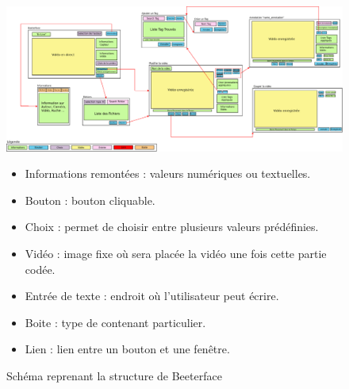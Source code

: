 \documentclass[11pt,french,a4paper]{report}
\begin{document}
\begin{landscape}
\begin{figure}[!h]
\begin{center}
\includegraphics[scale=0.2]{../images/dia/schema_interface.png}
    \setlength{\columnseprule}{0,3}
\begin{multicols}{2}
    \begin{itemize}[label=, leftmargin=*,parsep=0cm,itemsep=0cm,topsep=0cm]
        \item Informations remontées : valeurs numériques ou textuelles. 
        \item Bouton : bouton cliquable.
        \item Choix : permet de choisir entre plusieurs valeurs prédéfinies.
        \item Vidéo : image fixe où sera placée la vidéo une fois cette partie codée.
        \item Entrée de texte : endroit où l'utilisateur peut écrire. 
        \item Boite : type de contenant particulier. 
        \item Lien : lien entre un bouton et une fenêtre. 
    \end{itemize}
\end{multicols}
    \caption{Schéma reprenant la structure de Beeterface}
    \label{sch_beeterface}
\end{center}
\end{figure}

\end{landscape}
            
\dotfill \\
\end{document}
